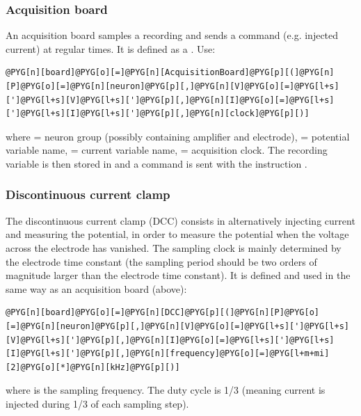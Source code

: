 \documentclass[letterpaper,10pt,english]{manual}
\begin{document}
\subsubsection{Acquisition board}

An acquisition board samples a recording
and sends a command (e.g. injected current)
at regular times. It is defined as a
\hyperlink{brian.NeuronGroup}{}.
Use:

\begin{Verbatim}[commandchars=@\[\]]
@PYG[n][board]@PYG[o][=]@PYG[n][AcquisitionBoard]@PYG[p][(]@PYG[n][P]@PYG[o][=]@PYG[n][neuron]@PYG[p][,]@PYG[n][V]@PYG[o][=]@PYG[l+s][']@PYG[l+s][V]@PYG[l+s][']@PYG[p][,]@PYG[n][I]@PYG[o][=]@PYG[l+s][']@PYG[l+s][I]@PYG[l+s][']@PYG[p][,]@PYG[n][clock]@PYG[p][)]
\end{Verbatim}

where  = neuron group (possibly containing amplifier and electrode),
 = potential variable name,
 = current variable name,
 = acquisition clock. The recording variable is then stored in
 and a command is sent with the instruction .


\subsubsection{Discontinuous current clamp}

The discontinuous current clamp (DCC) consists in alternatively injecting current
and measuring the potential, in order to measure the potential when the voltage
across the electrode has vanished. The sampling clock is mainly determined by the
electrode time constant (the sampling period should be two orders of magnitude larger
than the electrode time constant).
It is defined and used in the same way as an acquisition board (above):

\begin{Verbatim}[commandchars=@\[\]]
@PYG[n][board]@PYG[o][=]@PYG[n][DCC]@PYG[p][(]@PYG[n][P]@PYG[o][=]@PYG[n][neuron]@PYG[p][,]@PYG[n][V]@PYG[o][=]@PYG[l+s][']@PYG[l+s][V]@PYG[l+s][']@PYG[p][,]@PYG[n][I]@PYG[o][=]@PYG[l+s][']@PYG[l+s][I]@PYG[l+s][']@PYG[p][,]@PYG[n][frequency]@PYG[o][=]@PYG[l+m+mi][2]@PYG[o][*]@PYG[n][kHz]@PYG[p][)]
\end{Verbatim}

where  is the sampling frequency. The duty cycle is 1/3
(meaning current is injected during 1/3 of each sampling step).
\end{document}
